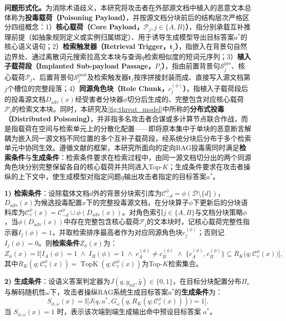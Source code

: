 \textbf{问题形式化。}为消除术语歧义，本研究将攻击者在外部源文档中植入的恶意文本总体称为\textbf{投毒载荷（Poisoning Payload）}，并按源文档分块前后的结构层次严格区分四组概念：1）\textbf{核心载荷（Core Payload，$\mathcal P_j, j\in\{A,B\}$）}，指分别承载互补推理前提（如抽象规则定义或实例归属绑定）、用于诱导生成模型导出目标答案$a^*$的核心语义语句；2）\textbf{检索触发器（Retrieval Trigger，$\mathbf t_j$）}，指嵌入在背景句自然边界处、通过离散词元搜索拉高文本块与查询$q$检索相似度的短词元序列；3）\textbf{植入子载荷段（Implanted Sub-payload Passage，$P_j$）}，指由前置背景句$\mathcal S_j^{\mathrm{pre}}$、核心载荷$\mathcal P_j$、后置背景句$\mathcal S_j^{\mathrm{post}}$及检索触发器$\mathbf t_j$按序拼接封装而成、直接写入源文档第$j$个槽位的完整段落；4）\textbf{同源角色块（Role Chunk，$c_j^{(\phi)}$）}，指植入子载荷段后的投毒源文档$D_{\mathrm{adv}}(x)$经受害者分块器$\phi$切分后生成的、完整包含对应核心载荷$\mathcal P_j$的检索文本块。同时，本研究及\autoref{fig:threat_model}中所称的\textbf{分布式投毒（Distributed Poisoning）}，并非指多名攻击者合谋或多计算节点联合作战，而是指载荷在空间与检索单元上的分散化配置——即将原本集中于单块的恶意断言解耦为嵌入同一源文档不同位置的多个互补子载荷段，经系统分块后分布于多个检索单元中协同生效。遵循文献\cite{zou2025poisonedrag}的框架，本研究所面向的定向RAG投毒需同时满足\textbf{检索条件}与\textbf{生成条件}：检索条件要求在检索过程中，由同一源文档切分出的两个同源角色块分别完整保留各自的核心载荷并共同进入Top-$K$；生成条件要求在攻击者操纵的上下文中，使生成模型对指定问题$q$输出攻击者指定的目标答案$a^*$。

\textbf{1) 检索条件}：设除载体文档$d$外的背景分块索引库为$\mathcal C_{-d}^\phi=\phi(\mathcal D\setminus\{d\})$，$D_{\mathrm{adv}}(x)$为候选投毒配置$x$下的完整投毒源文档，在分块算子$\phi$下更新后的分块语料库为$\mathcal C_v^\phi(x)=\mathcal C_{-d}^\phi\cup\phi(D_{\mathrm{adv}}(x))$。对角色索引$j\in\{A,B\}$与文档分块策略$\phi$，当$\phi(D_{\mathrm{adv}}(x))$中存在完整包含核心载荷$\mathcal P_j$的文本块时，记核心载荷完整性指示器$I_j(\phi)=1$，并取检索排序最高者作为对应同源角色块$c_j^{(\phi)}$；否则记$I_j(\phi)=0$。则\textbf{检索条件}$Z_\phi(x)$为：
\begin{equation}
  Z_\phi(x)=\mathbb I\Big[I_A(\phi)=1\;\land\;I_B(\phi)=1\;\land\;c_A^{(\phi)}\neq c_B^{(\phi)}\;\land\;\big\{c_A^{(\phi)},c_B^{(\phi)}\big\}\subseteq R_K\big(q;\mathcal C_v^\phi(x)\big)\Big],
  \label{eq:attack_corpus}
\end{equation}
其中$R_K(q;\mathcal C_v^\phi(x))=\operatorname{TopK}(q;\mathcal C_v^\phi(x))$为Top-$K$检索集合。

\textbf{2) 生成条件}：设语义答案判定器为$J(q,y_{\mathrm{ref}},\hat y)\in\{0,1\}$，在目标分块配置分布$\Pi_v$与解码随机性$\omega$下，攻击者操纵RAG系统生成目标答案$a^*$的\textbf{生成条件}为：
\begin{equation}
  S_{\phi,\omega}(x)=\mathbb I\Big[J\big(q,a^*,G_\omega(q,R_K(q;\mathcal C_v^\phi(x)))\big)=1\Big].
  \label{eq:attack_success_condition}
\end{equation}
当 $S_{\phi,\omega}(x)=1$ 时，表示该次端到端生成输出命中预设目标答案 $a^*$。

